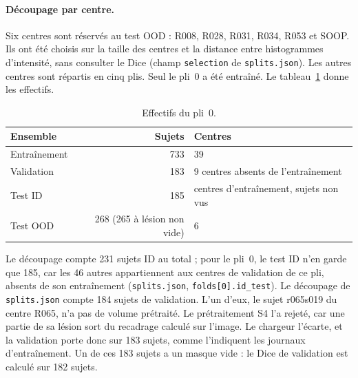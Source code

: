 \paragraph{Découpage par centre.}
Six centres sont réservés au test OOD : R008, R028, R031, R034, R053 et SOOP.
Ils ont été choisis sur la taille des centres et la distance entre histogrammes d'intensité, sans consulter le Dice (champ \texttt{selection} de \nolinkurl{splits.json}).
Les autres centres sont répartis en cinq plis. Seul le pli~0 a été entraîné. Le tableau~\ref{tab:rq3-donnees} donne les effectifs.

\begin{table}[htbp]
  \centering
  \caption{Effectifs du pli~0.}
  \label{tab:rq3-donnees}
  \begin{tabular}{lrl}
    \toprule
    Ensemble & Sujets & Centres \\
    \midrule
    Entraînement & 733 & 39 \\
    Validation & 183 & 9 centres absents de l'entraînement \\
    Test ID & 185 & centres d'entraînement, sujets non vus \\
    Test OOD & 268 (265 à lésion non vide) & 6 \\
    \bottomrule
  \end{tabular}
\end{table}

Le découpage compte 231 sujets ID au total ; pour le pli~0, le test ID n'en garde que 185, car les 46 autres appartiennent aux centres de validation de ce pli, absents de son entraînement (\nolinkurl{splits.json}, \texttt{folds[0].id\_test}).
Le découpage de \nolinkurl{splits.json} compte 184 sujets de validation.
L'un d'eux, le sujet r065s019 du centre R065, n'a pas de volume prétraité.
Le prétraitement S4 l'a rejeté, car une partie de sa lésion sort du recadrage calculé sur l'image.
Le chargeur l'écarte, et la validation porte donc sur 183 sujets, comme l'indiquent les journaux d'entraînement.
Un de ces 183 sujets a un masque vide : le Dice de validation est calculé sur 182 sujets.


